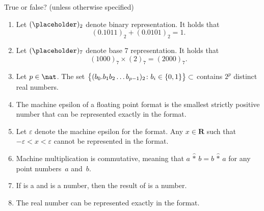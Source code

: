 \documentclass[a4paper]{article}
\begin{document}
\pagestyle{empty}
\thispagestyle{fancy}



True or false? (unless otherwise specified)

\begin{enumerate}

    \item
        Let $(\placeholder)_2$ denote binary representation.
        It holds that
        \[
            (0.1011)_2 + (0.0101)_2 = 1.
        \]

    \item
        Let $(\placeholder)_7$ denote base 7 representation.
        It holds that
        \[
            (1000)_7 \times (2)_7 = (2000)_7.
        \]

    \item
        Let $p \in \nat$.
        The set
        \(
            \bigl\{ (b_0. b_1 b_2 \dots b_{p-1})_2 \colon b_i \in \{0, 1\} \bigr\} \subset \real
        \)
        contains $2^{p}$ distinct real numbers.

    \item
        The machine epsilon of a floating point format is the smallest strictly positive number that can be represented exactly in the format.

    \item
        Let $\varepsilon$ denote the machine epsilon for the  format.
        Any $x \in \mathbf R$ such that $-\varepsilon < x < \varepsilon$
        cannot be represented in the  format.

    \item
        Machine multiplication is commutative,
        meaning that $a \,{\widehat *}\, b = b \,{\widehat *}\, a$
        for any  point numbers~$a$ and~$b$.

    \item
        If  is a  and  is a  number,
        then the result of  is a  number.

    \item
        The real number  can be represented exactly in the  format.


\end{enumerate}
\end{document}
